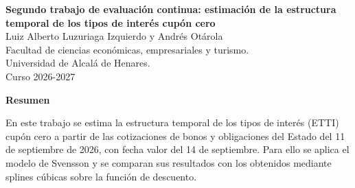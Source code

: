 \documentclass[a4paper,12pt]{article}
\begin{document}
\begin{titlepage}
    \centering
    \vspace*{0.1cm}
    \LARGE\textbf{Segundo trabajo de evaluación continua: estimación de la estructura temporal de los tipos de interés cupón cero}\\
    \vspace{1cm}
    \small{Luiz Alberto Luzuriaga Izquierdo y Andrés Otárola}\\
    \vspace{0.1cm}
    Facultad de ciencias económicas, empresariales y turismo. \\
    \vspace{0.1cm}
    Universidad de Alcalá de Henares. \\
    \vspace{0.1cm}
    Curso 2026-2027\\
    \vspace{0.5cm}

{\bfseries Resumen}

\vspace{0.1cm}
\noindent
\begin{justify}
En este trabajo se estima la estructura temporal de los tipos de interés (ETTI) cupón cero a partir de las cotizaciones de bonos y obligaciones del Estado del 11 de septiembre de 2026, con fecha valor del 14 de septiembre. Para ello se aplica el modelo de Svensson y se comparan sus resultados con los obtenidos mediante splines cúbicas sobre la función de descuento.


\end{justify}
\end{titlepage}
\end{document}
